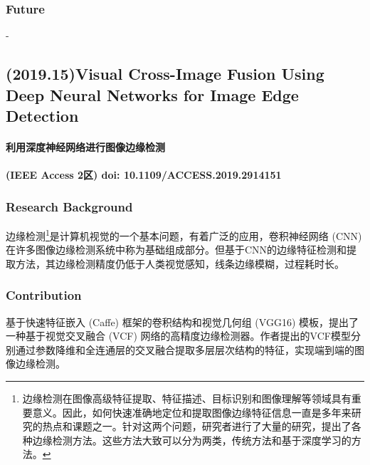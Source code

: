 \documentclass[letterpaper,10pt]{article}
\begin{document}
			
			
			\subsubsection{Future}
			
			-
			
		\subsection{(2019.15)Visual Cross-Image Fusion Using Deep Neural Networks for Image Edge Detection}
		
		\paragraph{利用深度神经网络进行图像边缘检测}
		
		\paragraph{(IEEE Access 2区) doi: 10.1109/ACCESS.2019.2914151}
		
			\subsubsection{Research Background}
			
			边缘检测\footnote{边缘检测在图像高级特征提取、特征描述、目标识别和图像理解等领域具有重要意义。因此，如何快速准确地定位和提取图像边缘特征信息一直是多年来研究的热点和课题之一。针对这两个问题，研究者进行了大量的研究，提出了各种边缘检测方法。这些方法大致可以分为两类，传统方法和基于深度学习的方法。}是计算机视觉的一个基本问题，有着广泛的应用，卷积神经网络 (CNN) 在许多图像边缘检测系统中称为基础组成部分。但基于CNN的边缘特征检测和提取方法，其边缘检测精度仍低于人类视觉感知，线条边缘模糊，过程耗时长。
			
			\subsubsection{Contribution}

			基于快速特征嵌入 (Caffe) 框架的卷积结构和视觉几何组 (VGG16) 模板，提出了一种基于视觉交叉融合 (VCF) 网络的高精度边缘检测器。作者提出的VCF模型分别通过参数降维和全连通层的交叉融合提取多层层次结构的特征，实现端到端的图像边缘检测。
		
\end{document}
